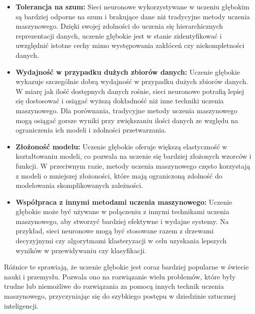 \begin{itemize}
\item \textbf{Tolerancja na szum:} Sieci neuronowe wykorzystywane w uczeniu głębokim są bardziej odporne na szum i brakujące dane niż tradycyjne metody uczenia maszynowego. Dzięki swojej zdolności do uczenia się hierarchicznych reprezentacji danych, uczenie głębokie jest w stanie zidentyfikować i uwzględnić istotne cechy mimo występowania zakłóceń czy niekompletności danych.

\item \textbf{Wydajność w przypadku dużych zbiorów danych:} Uczenie głębokie wykazuje szczególnie dobrą wydajność w przypadku dużych zbiorów danych. W miarę jak ilość dostępnych danych rośnie, sieci neuronowe potrafią lepiej się dostosować i osiągać wyższą dokładność niż inne techniki uczenia maszynowego. Dla porównania, tradycyjne metody uczenia maszynowego mogą osiągać gorsze wyniki przy zwiększaniu ilości danych ze względu na ograniczenia ich modeli i zdolności przetwarzania.

\item \textbf{Złożoność modelu:} Uczenie głębokie oferuje większą elastyczność w kształtowaniu modeli, co pozwala na uczenie się bardziej złożonych wzorców i funkcji. W przeciwnym razie, metody uczenia maszynowego często korzystają z modeli o mniejszej złożoności, które mają ograniczoną zdolność do modelowania skomplikowanych zależności.

\item \textbf{Współpraca z innymi metodami uczenia maszynowego:} Uczenie głębokie może być używane w połączeniu z innymi technikami uczenia maszynowego, aby stworzyć bardziej efektywne i wydajne systemy. Na przykład, sieci neuronowe mogą być stosowane razem z drzewami decyzyjnymi czy algorytmami klasteryzacji w celu uzyskania lepszych wyników w przewidywaniu czy klasyfikacji.

\end{itemize}

Różnice te sprawiają, że uczenie głębokie jest coraz bardziej popularne w świecie nauki i przemysłu. Pozwala ono na rozwiązanie wielu problemów, które były trudne lub niemożliwe do rozwiązania za pomocą innych technik uczenia maszynowego, przyczyniając się do szybkiego postępu w dziedzinie sztucznej inteligencji.

